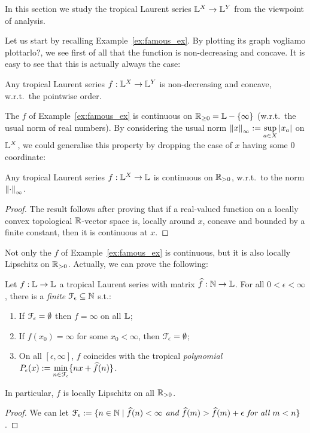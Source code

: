 In this section we study the tropical Laurent series $\mathbb{L}^X\to \mathbb{L} ^Y$ from the viewpoint of analysis.

Let us start by recalling Example~\ref{ex:famous_ex}.
By plotting its graph {\color{red}vogliamo plottarlo?}, we see first of all that the function is non-decreasing and concave.
It is easy to see that this is actually always the case:

\begin{proposition}
 Any tropical Laurent series $f:\mathbb{L}^X\to\mathbb{L}^Y$ is non-decreasing and concave, w.r.t.\ the pointwise order.
\end{proposition}

The $f$ of Example~\ref{ex:famous_ex} is continuous on $\mathbb{R}_{\geq0}=\mathbb{L}-\{\infty\}$ (w.r.t.\ the usual norm of real numbers).
By considering the usual norm $\left\lVert x\right\rVert_\infty:=\sup\limits_{a\in X} \left\lvert x_a\right\rvert$ on $\mathbb{L}^X$, we could generalise this property by dropping the case of $x$ having some $0$ coordinate:

\begin{theorem}\label{thm:cont}
 Any tropical Laurent series $f:\mathbb{L}^X\to\mathbb{L}$ is continuous on $\mathbb{R}_{>0}$, w.r.t.\ to the norm $\left\lVert\cdot\right\rVert_\infty$.
\end{theorem}
\begin{proof}
 The result follows after proving that if a real-valued function on a locally convex topological $\mathbb{R}$-vector space is, locally around $x$, concave and bounded by a finite constant, then it is continuous at $x$.
\end{proof}

Not only the $f$ of Example~\ref{ex:famous_ex} is continuous, but it is also locally Lipschitz on $\mathbb{R}_{>0}$.
Actually, we can prove the following:

\begin{theorem}
 Let $f:\mathbb{L}\to\mathbb{L}$ a tropical Laurent series with matrix $\widehat f:\mathbb{N}\to\mathbb{L}$.
 For all $0<\epsilon<\infty$, there is a \emph{finite} $\mathcal{F}_\epsilon \subseteq \mathbb{N}$ s.t.:
 \begin{enumerate}
  \item If $\mathcal{F}_\epsilon=\emptyset$ then $f=\infty$ on all $\mathbb{L}$;
  \item If $f(x_0)=\infty$ for some $x_0<\infty$, then $\mathcal{F}_\epsilon=\emptyset$;
  \item On all $[\epsilon,\infty]$, $f$ coincides with the tropical \emph{polynomial} $P_\epsilon(x):=\min\limits_{n\in \mathcal{F}_\epsilon}\{nx+\widehat f(n)\}$.
 \end{enumerate}
 In particular, $f$ is locally Lipschitz on all $\mathbb{R}_{>0}$.
\end{theorem}
\begin{proof}
 We can let $\mathcal{F}_\epsilon:=\{n\in\mathbb{N} \mid
 \widehat f(n)<\infty \textit{ and } \widehat f(m)> \widehat f(m)+\epsilon \textit{ for all } m<n\}$.
\end{proof}

